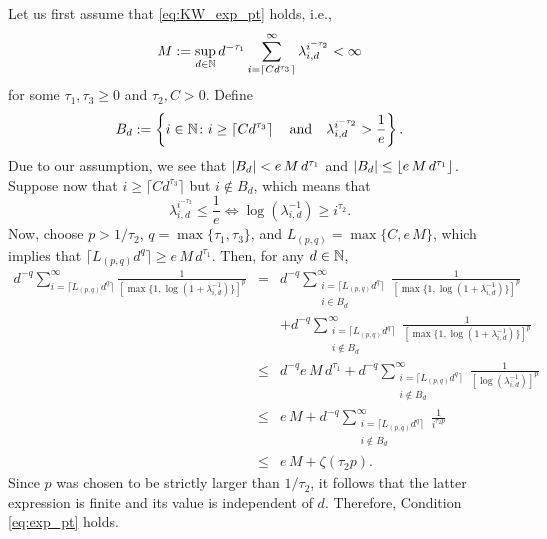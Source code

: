 \documentclass[sort&compress]{elsarticle}
\begin{document}
{Let us first assume that \eqref{eq:KW_exp_pt} holds, i.e.,
\[
M:=\sup_{d\in\mathbb{N}} d^{-\tau_1} \sum_{i=\lceil C d^{\tau_3} \rceil}^{\infty} \lambda_{i,d}^{i^{-\tau_2}} < \infty 
\]
for some $\tau_1,\tau_3\ge 0$ and $\tau_2, C>0$.
Define
\[
B_d:=\left\{i\in\mathbb{N} \colon i\ge \left\lceil Cd^{\tau_3}\right\rceil\quad\mbox{and}\quad 
\lambda_{i,d}^{i^{-\tau_2}}>\frac{1}{e}\right\}.
\]
Due to our assumption, we see that $\left \lvert B_d \right \rvert < e\,M\,d^{\tau_1}$ and $\left \lvert B_d \right \rvert\le \lfloor e\,M\,d^{\tau_1} \rfloor$. Suppose now that $i\ge \lceil C d^{\tau_3}\rceil$ but $i\not\in B_d$, which means that 
\[\lambda_{i,d}^{i^{-\tau_2}} \le \frac{1}{e} \Leftrightarrow \log (\lambda_{i,d}^{-1})\ge i^{\tau_2}.\]
Now, choose $p> 1/\tau_2$, $q=\max\{\tau_1,\tau_3\}$, and $L_{(p,q)}=\max\{C, e\, M\}$, which implies that $\lceil L_{(p,q)} d^{q}\rceil \ge e\, M\, d^{\tau_1}$. Then, for any $d\in\mathbb{N}$, 
\begin{eqnarray*}
d^{-q} \sum_{i=\lceil L_{(p,q)} d^{q}\rceil}^\infty \frac{1}{[\max\{1,\log(1+\lambda_{i,d}^{-1})\}]^p}&=&d^{-q} \sum_{\substack{i=\lceil L_{(p,q)} d^{q}\rceil\\ i\in B_d}}^\infty \frac{1}{[\max\{1,\log(1+\lambda_{i,d}^{-1})\}]^p}\\
&& + d^{-q} \sum_{\substack{i=\lceil L_{(p,q)} d^{q}\rceil\\ i\not\in B_d}}^\infty \frac{1}{[\max\{1,\log(1+\lambda_{i,d}^{-1})\}]^p}\\
&\le& d^{-q} e\, M\, d^{\tau_1} + d^{-q}\sum_{\substack{i=\lceil L_{(p,q)} d^{q}\rceil\\ i\not\in B_d}}^\infty \frac{1}{[\log (\lambda_{i,d}^{-1})]^p}\\
&\le& e\, M + d^{-q}\sum_{\substack{i=\lceil L_{(p,q)} d^{q}\rceil\\ i\not\in B_d}}^\infty \frac{1}{i^{\tau_2 p}}\\
&\le & e\, M + \zeta (\tau_2 p).
\end{eqnarray*}
Since $p$ was chosen to be strictly larger than $1/\tau_2$, it follows that the latter expression is finite and its value is independent of $d$. Therefore, Condition \eqref{eq:exp_pt} holds.

}
\end{document}
